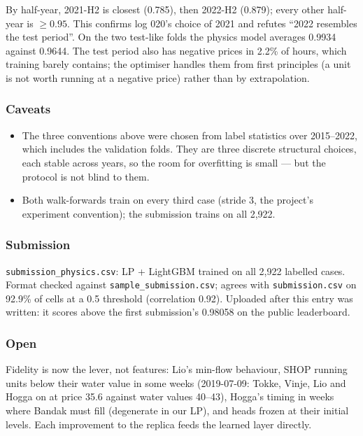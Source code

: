 By half-year, 2021-H2 is closest (0.785), then 2022-H2 (0.879); every other half-year is
$\geq 0.95$. This confirms log 020's choice of 2021 and refutes ``2022 resembles the test period''.
On the two test-like folds the physics model averages 0.9934 against 0.9644. The test period also
has negative prices in 2.2\% of hours, which training barely contains; the optimiser handles them
from first principles (a unit is not worth running at a negative price) rather than by extrapolation.

\subsubsection*{Caveats}

\begin{itemize}
  \item The three conventions above were chosen from label statistics over 2015--2022, which
        includes the validation folds. They are three discrete structural choices, each stable
        across years, so the room for overfitting is small --- but the protocol is not blind to them.
  \item Both walk-forwards train on every third case (stride 3, the project's experiment
        convention); the submission trains on all 2{,}922.
\end{itemize}

\subsubsection*{Submission}

\texttt{submission\_physics.csv}: LP + LightGBM trained on all 2{,}922 labelled cases. Format checked
against \texttt{sample\_submission.csv}; agrees with \texttt{submission.csv} on 92.9\% of cells at a
0.5 threshold (correlation 0.92). Uploaded after this entry was written: it scores above the
first submission's 0.98058 on the public leaderboard.

\subsubsection*{Open}

Fidelity is now the lever, not features: Lio's min-flow behaviour, SHOP running units below their
water value in some weeks (2019-07-09: Tokke, Vinje, Lio and Hogga on at price 35.6 against water
values 40--43), Hogga's timing in weeks where Bandak must fill (degenerate in our LP), and heads
frozen at their initial levels. Each improvement to the replica feeds the learned layer directly.
